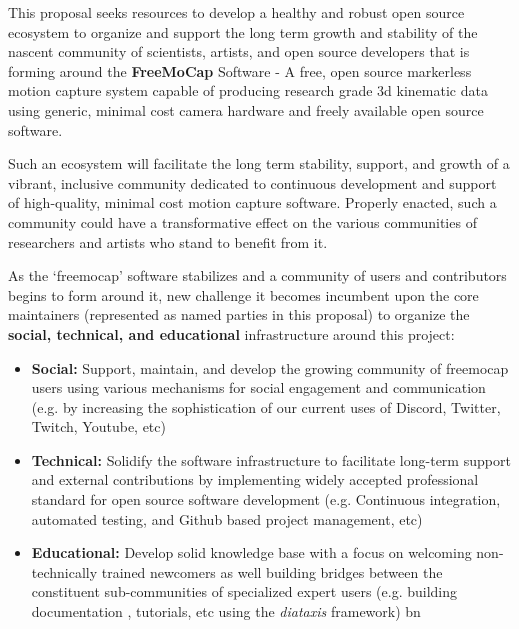 
\noindent This proposal seeks resources to develop a healthy and robust open source ecosystem to organize and support the long term growth and stability of the nascent community of scientists, artists, and open source developers that is forming around the \textbf{FreeMoCap} Software - A free, open source markerless motion capture system capable of producing research grade 3d kinematic data using generic, minimal cost camera hardware and freely available open source software. 

 Such an ecosystem will facilitate the long term stability, support, and growth of a vibrant, inclusive community dedicated to continuous development and support of high-quality, minimal cost motion capture software. Properly enacted, such a community could have a transformative effect on the various communities of researchers and artists who stand to benefit from it.
 
As the `freemocap' software stabilizes and a community of users and contributors begins to form around it, new challenge it becomes incumbent upon the core maintainers (represented as named parties in this proposal) to organize the \textbf{social, technical, and educational} infrastructure around this project:

\begin{itemize}

    \item \textbf{Social:} Support, maintain, and develop the growing community of freemocap users using various mechanisms for social engagement and communication (e.g. by increasing the sophistication of our current uses of Discord, Twitter, Twitch, Youtube, etc)
    
    \item \textbf{Technical:} Solidify the software infrastructure to facilitate long-term support and external contributions by implementing widely accepted professional standard for open source software development (e.g. Continuous integration, automated testing, and Github based project management, etc)
    
    \item \textbf{Educational:} Develop solid knowledge base with a focus on welcoming non-technically trained newcomers as well building bridges between the constituent sub-communities of specialized expert users (e.g. building documentation , tutorials, etc using the \textit{diataxis} framework) bn  

\end{itemize}

